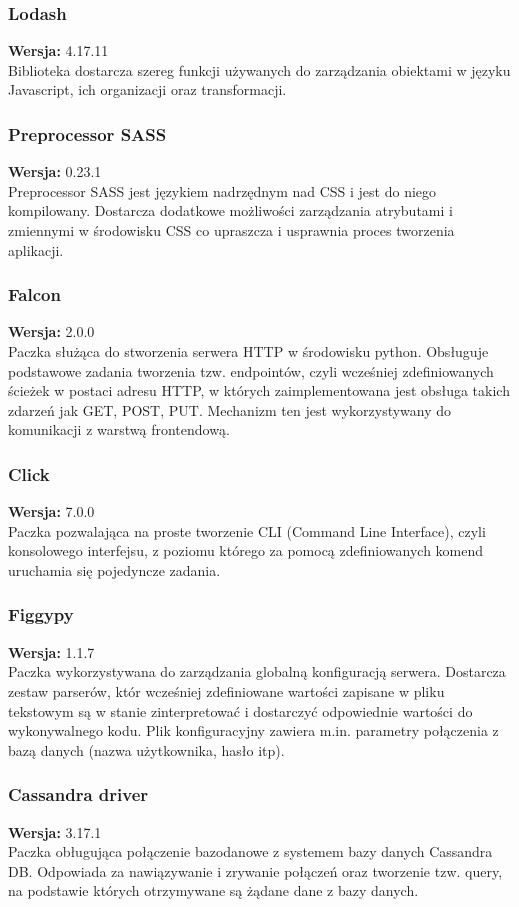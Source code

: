\documentclass[eng,printmode]{mgr}
\begin{document}
\subsubsection{Lodash}
\small \textbf{Wersja:} 4.17.11\\
Biblioteka dostarcza szereg funkcji używanych do zarządzania obiektami w języku Javascript, ich organizacji oraz transformacji.
\subsubsection{Preprocessor SASS}
\small \textbf{Wersja:} 0.23.1\\
Preprocessor SASS jest językiem nadrzędnym nad CSS i jest do niego kompilowany. Dostarcza dodatkowe możliwości zarządzania atrybutami i zmiennymi w środowisku CSS co upraszcza i usprawnia proces tworzenia aplikacji.
\subsubsection{Falcon}
\small \textbf{Wersja:} 2.0.0\\
Paczka służąca do stworzenia serwera HTTP w środowisku python. Obsługuje podstawowe zadania tworzenia tzw. endpointów, czyli wcześniej zdefiniowanych ścieżek w postaci adresu HTTP, w których zaimplementowana jest obsługa takich zdarzeń jak GET, POST, PUT. Mechanizm ten jest wykorzystywany do komunikacji z warstwą frontendową.
\subsubsection{Click}
\small \textbf{Wersja:} 7.0.0\\
Paczka pozwalająca na proste tworzenie CLI (Command Line Interface), czyli konsolowego interfejsu, z poziomu którego za pomocą zdefiniowanych komend uruchamia się pojedyncze zadania.
\subsubsection{Figgypy}
\small \textbf{Wersja:} 1.1.7\\
Paczka wykorzystywana do zarządzania globalną konfiguracją serwera. Dostarcza zestaw parserów, któr wcześniej zdefiniowane wartości zapisane w pliku tekstowym są w stanie zinterpretować i dostarczyć odpowiednie wartości do wykonywalnego kodu. Plik konfiguracyjny zawiera m.in. parametry połączenia z bazą danych (nazwa użytkownika, hasło itp).
\subsubsection{Cassandra driver}
\small \textbf{Wersja:} 3.17.1\\
Paczka obługująca połączenie bazodanowe z systemem bazy danych Cassandra DB. Odpowiada za nawiązywanie i zrywanie połączeń oraz tworzenie tzw. query, na podstawie których otrzymywane są żądane dane z bazy danych.
\end{document}
